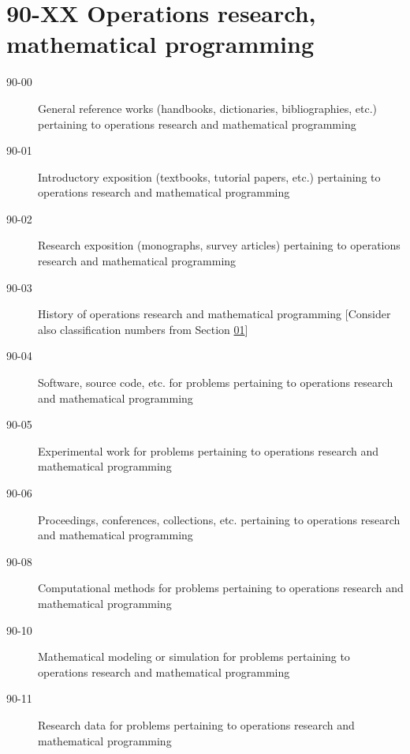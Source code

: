 \section*{90-XX Operations research, mathematical programming }\label{90-XX}
\begin{description}
\item [90-00]\label{90-00} General reference works (handbooks, dictionaries, bibliographies, etc.) pertaining to operations research and mathematical programming
\item [90-01]\label{90-01} Introductory exposition (textbooks, tutorial papers, etc.) pertaining to operations research and mathematical programming
\item [90-02]\label{90-02} Research exposition (monographs, survey articles) pertaining to operations research and mathematical programming
\item [90-03]\label{90-03} History of operations research and mathematical programming [Consider also classification numbers from Section \hyperref[01-XX]{01}]
\item [90-04]\label{90-04} Software, source code, etc. for problems pertaining to operations research and mathematical programming
\item [90-05]\label{90-05} Experimental work for problems pertaining to operations research and mathematical programming
\item [90-06]\label{90-06} Proceedings, conferences, collections, etc. pertaining to operations research and mathematical programming
\item [90-08]\label{90-08} Computational methods for problems pertaining to operations research and mathematical programming
\item [90-10]\label{90-10} Mathematical modeling or simulation for problems pertaining to operations research and mathematical programming
\item [90-11]\label{90-11} Research data for problems pertaining to operations research and mathematical programming
\end{description}

